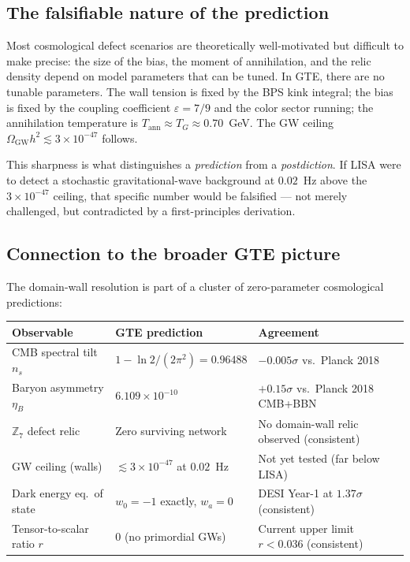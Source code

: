\documentclass[11pt,a4paper]{article}
\newcommand{\ZS}{\mathbb{Z}_7}
\begin{document}
\subsection{The falsifiable nature of the prediction}

Most cosmological defect scenarios are theoretically well-motivated but
difficult to make precise: the size of the bias, the moment of annihilation,
and the relic density depend on model parameters that can be tuned.
In GTE, there are no tunable parameters.
The wall tension is fixed by the BPS kink integral; the bias is fixed by the
coupling coefficient $\varepsilon = 7/9$ and the color sector running; the
annihilation temperature is $T_\mathrm{ann} \approx T_G \approx 0.70$~GeV.
The GW ceiling $\Omega_\mathrm{GW} h^2 \lesssim 3\times10^{-47}$ follows.

This sharpness is what distinguishes a \emph{prediction} from a
\emph{postdiction}.
If LISA were to detect a stochastic gravitational-wave background at $0.02$~Hz
above the $3\times10^{-47}$ ceiling, that specific number would be falsified
--- not merely challenged, but contradicted by a first-principles derivation.

\subsection{Connection to the broader GTE picture}

The domain-wall resolution is part of a cluster of zero-parameter
cosmological predictions:

\begin{center}
\begin{tabular}{P{3.6cm} P{4.0cm} P{4.5cm}}
\toprule
\textbf{Observable} & \textbf{GTE prediction} & \textbf{Agreement} \\
\midrule
CMB spectral tilt $n_s$ & $1 - \ln 2/(2\pi^2) = 0.96488$ & $-0.005\sigma$
  vs.\ Planck 2018 \\[4pt]
Baryon asymmetry $\eta_B$ & $6.109\times10^{-10}$ & $+0.15\sigma$
  vs.\ Planck 2018 CMB+BBN \\[4pt]
$\ZS$ defect relic & Zero surviving network & No domain-wall relic
  observed (consistent) \\[4pt]
GW ceiling (walls) & $\lesssim 3\times10^{-47}$ at $0.02$~Hz &
  Not yet tested (far below LISA) \\[4pt]
Dark energy eq.\ of state & $w_0 = -1$ exactly, $w_a = 0$ & DESI Year-1
  at $1.37\sigma$ (consistent) \\[4pt]
Tensor-to-scalar ratio $r$ & $0$ (no primordial GWs) & Current upper limit
  $r < 0.036$ (consistent) \\
\bottomrule
\end{tabular}
\end{center}
\end{document}
